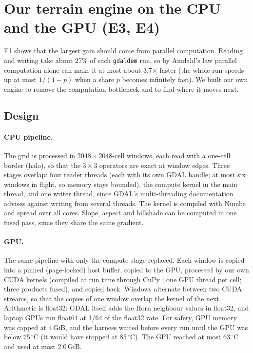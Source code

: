 \documentclass[11pt,a4paper]{article}
\begin{document}
\section{Our terrain engine on the CPU and the GPU (E3, E4)}\label{sec:engine}
E1 shows that the largest gain should come from parallel computation. Reading and writing take about 27\% of each
\texttt{gdaldem} run, so by Amdahl's law parallel computation alone can make it at most about 3.7$\times$ faster
(the whole run speeds up at most $1/(1-p)$ when a share $p$ becomes infinitely fast). We built our own engine to
remove the computation bottleneck and to find where it moves next.

\subsection{Design}
\paragraph{CPU pipeline.} The grid is processed in $2048\times2048$-cell windows, each read with a one-cell border
(halo), so that the $3\times3$ operators are exact at window edges. Three stages overlap: four reader threads (each
with its own GDAL handle; at most six windows in flight, so memory stays bounded), the compute kernel in the main
thread, and one writer thread, since GDAL's multi-threading documentation advises against writing from several
threads. The kernel is compiled with Numba \cite{numba} and spread over all cores. Slope, aspect and hillshade can be
computed in one fused pass, since they share the same gradient.

\paragraph{GPU.} The same pipeline with only the compute stage replaced. Each window is copied into a pinned
(page-locked) host buffer, copied to the GPU, processed by our own CUDA kernels (compiled at run time through CuPy
\cite{cupy}; one GPU thread per cell; three products fused), and copied back. Windows alternate between two CUDA
streams, so that the copies of one window overlap the kernel of the next. Arithmetic is float32: GDAL itself adds
the Horn neighbour values in float32, and laptop GPUs run float64 at 1/64 of the float32 rate. For safety, GPU
memory was capped at 4\,GiB, and the harness waited before every run until the GPU was below 75\,$^\circ$C (it would
have stopped at 85\,$^\circ$C). The GPU reached at most 63\,$^\circ$C and used at most 2.0\,GiB.
\end{document}
